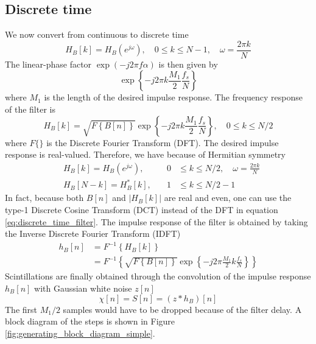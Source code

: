 \subsection{Discrete time}
We now convert from continuous to discrete time
\begin{equation}
 H_B[k] = H_B(e^{j\omega}), \quad 0 \leq k \leq N-1, \quad  \omega = \frac{2 \pi k}{N}
\end{equation}
The linear-phase factor $\exp{\left(-j 2\pi f \alpha\right)}$ is then given by
\begin{equation}
 \exp \left\{ -j 2\pi k \frac{M_1}{2} \frac{f_s}{N} \right\}
\end{equation}
where $M_1$ is the length of the desired impulse response. The frequency response of the filter is
\begin{equation}\label{eq:discrete_time_filter}
 H_B[k] =  \sqrt{ F \left\{  B[n] \right\}  } \exp \left\{ -j 2\pi k \frac{M_1}{2} \frac{f_s}{N} \right\},  \quad 0 \leq k \leq N/2
\end{equation}
where $F\{\}$ is the Discrete Fourier Transform (DFT).
The desired impulse response is real-valued. Therefore, we have because of Hermitian symmetry
\begin{equation}
\begin{aligned}
 &H_B[k] = H_B(e^{j\omega}), &\quad 0 &\leq k \leq N/2, \quad  \omega = \frac{2 \pi k}{N} \\
 &H_B[N-k] = H_B^{*} [k], &\quad 1 &\leq k \leq N/2 - 1
\end{aligned}
\end{equation}
In fact, because both $B[n]$ and $|H_B[k]|$ are real and even, one can use the type-1 Discrete Cosine Transform (DCT) instead of the DFT in equation \eqref{eq:discrete_time_filter}.
The impulse response of the filter is obtained by taking the Inverse Discrete Fourier Transform (IDFT)
\begin{equation}
 \begin{aligned}
 h_B[n] &= F^{-1} \left\{ H_B[k] \right\} \\
  &= F^{-1} \left\{ \sqrt{ F \left\{  B[n] \right\}  } \exp \left\{ -j 2\pi \frac{M_1}{2} k \frac{f_s}{N} \right\} \right\}
\end{aligned}
\end{equation}
Scintillations are finally obtained through the convolution of the impulse response $h_B[n]$ with Gaussian white noise $z[n]$
\begin{equation}\label{eq:scintillations_convolution_discrete}
 \chi[n] = S[n] = (z \ast h_B ) [n]
\end{equation}
The first $M_1/2$ samples would have to be dropped because of the filter delay.
A block diagram of the steps is shown in Figure \ref{fig:generating_block_diagram_simple}.

